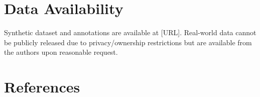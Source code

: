 \documentclass[12pt,a4paper]{article}
\begin{document}
\section*{Data Availability}
Synthetic dataset and annotations are available at [URL]. Real-world data cannot be publicly released due to privacy/ownership restrictions but are available from the authors upon reasonable request.

\vfill
\section*{References}


\end{document}

